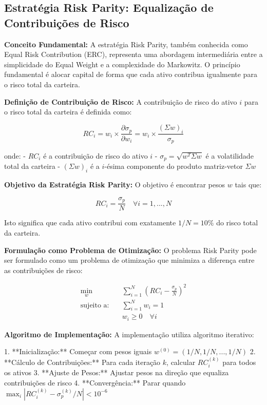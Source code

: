 \subsection{Estratégia Risk Parity: Equalização de Contribuições de Risco}

\textbf{Conceito Fundamental:} A estratégia Risk Parity, também conhecida como Equal Risk Contribution (ERC), representa uma abordagem intermediária entre a simplicidade do Equal Weight e a complexidade do Markowitz. O princípio fundamental é alocar capital de forma que cada ativo contribua igualmente para o risco total da carteira.

\textbf{Definição de Contribuição de Risco:} A contribuição de risco do ativo $i$ para o risco total da carteira é definida como:

\begin{equation}
RC_i = w_i \times \frac{\partial \sigma_p}{\partial w_i} = w_i \times \frac{(\Sigma w)_i}{\sigma_p}
\end{equation}

onde:
- $RC_i$ é a contribuição de risco do ativo $i$
- $\sigma_p = \sqrt{w^T \Sigma w}$ é a volatilidade total da carteira
- $(\Sigma w)_i$ é a $i$-ésima componente do produto matriz-vetor $\Sigma w$

\textbf{Objetivo da Estratégia Risk Parity:} O objetivo é encontrar pesos $w$ tais que:

\begin{equation}
RC_i = \frac{\sigma_p}{N} \quad \forall i = 1, ..., N
\end{equation}

Isto significa que cada ativo contribui com exatamente $1/N = 10\%$ do risco total da carteira.

\textbf{Formulação como Problema de Otimização:} O problema Risk Parity pode ser formulado como um problema de otimização que minimiza a diferença entre as contribuições de risco:

\begin{align}
\min_{w} \quad & \sum_{i=1}^{N} \left(RC_i - \frac{\sigma_p}{N}\right)^2 \\
\text{sujeito a:} \quad & \sum_{i=1}^{N} w_i = 1 \\
& w_i \geq 0 \quad \forall i
\end{align}

\textbf{Algoritmo de Implementação:} A implementação utiliza algoritmo iterativo:

1. **Inicialização:** Começar com pesos iguais $w^{(0)} = (1/N, 1/N, ..., 1/N)$
2. **Cálculo de Contribuições:** Para cada iteração $k$, calcular $RC_i^{(k)}$ para todos os ativos
3. **Ajuste de Pesos:** Ajustar pesos na direção que equaliza contribuições de risco
4. **Convergência:** Parar quando $\max_i |RC_i^{(k)} - \sigma_p^{(k)}/N| < 10^{-6}$

